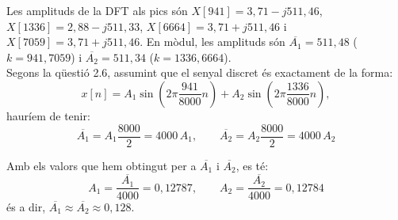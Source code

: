 \documentclass[11pt,a4]{article}
\numberwithin{equation}{section}
\theoremstyle{thmstyle}
\theoremstyle{thmstyle}
\theoremstyle{thmstyle}
\theoremstyle{thmstyle}
\theoremstyle{thmstyle}
\theoremstyle{thmstyle}
\theoremstyle{thmstyle}
\begin{document}
Les amplituds de la DFT als pics són $X[941] = 3,71-j511,46$, $X[1336] = 2,88-j511,33$, $X[6664] = 3,71+j511,46$ i $X[7059] = 3,71+j511,46$. En mòdul, les amplituds són $\overline{A_1}=511,48$ ($k=941,7059$) i $\overline{A_2}=511,34$ ($k=1336,6664$).
\\

Segons la qüestió 2.6, assumint que el senyal discret és exactament de la forma:
$$
x[n] = A_1 \sin(2\pi\frac{941}{8000}n) + A_2 \sin(2\pi\frac{1336}{8000}n),
$$
hauríem de tenir:
$$
\overline{A_1}=A_1\frac{8000}{2}=4000\,A_1,\quad \quad \overline{A_2}=A_2\frac{8000}{2}=4000\,A_2
$$

Amb els valors que hem obtingut per a $\overline{A_1}$ i $\overline{A_2}$, es té:
$$
A_1=\frac{\overline{A_1}}{4000}=0,12787,\quad\quad A_2=\frac{\overline{A_2}}{4000}=0,12784
$$
és a dir, $\overline{A_1}\approx\overline{A_2}\approx0,128$. 
\end{document}
